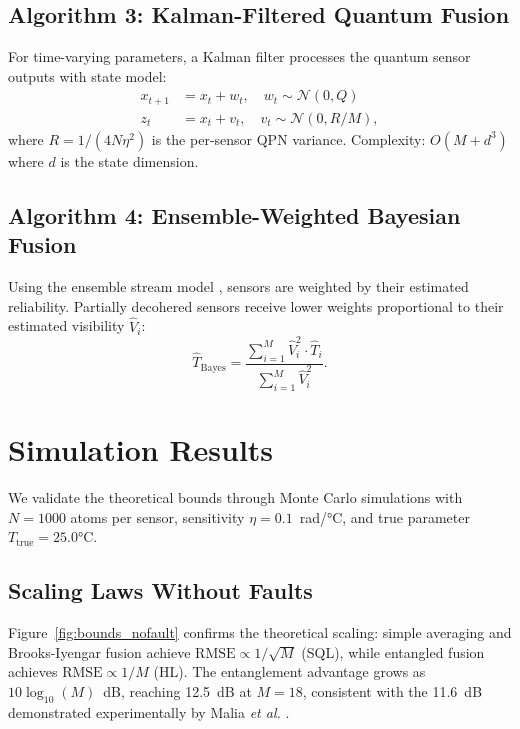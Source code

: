 \documentclass[twocolumn,11pt]{article}
\begin{document}
\subsection{Algorithm 3: Kalman-Filtered Quantum Fusion}

For time-varying parameters, a Kalman filter processes the
quantum sensor outputs with state model:
\begin{align}
    x_{t+1} &= x_t + w_t, \quad w_t \sim \mathcal{N}(0, Q) \\
    z_t &= x_t + v_t, \quad v_t \sim \mathcal{N}(0, R/M),
\end{align}
where $R = 1/(4N\eta^2)$ is the per-sensor QPN variance.
Complexity: $O(M + d^3)$ where $d$ is the state dimension.

\subsection{Algorithm 4: Ensemble-Weighted Bayesian Fusion}

Using the ensemble stream model \cite{iyer2013dissertation},
sensors are weighted by their estimated reliability.
Partially decohered sensors receive lower weights proportional
to their estimated visibility $\hat{V}_i$:
\begin{equation}
    \hat{T}_{\mathrm{Bayes}} =
    \frac{\sum_{i=1}^{M} \hat{V}_i^2 \cdot \hat{T}_i}
         {\sum_{i=1}^{M} \hat{V}_i^2}.
    \label{eq:bayesian}
\end{equation}


\section{Simulation Results}
\label{sec:simulations}

We validate the theoretical bounds through Monte Carlo
simulations with $N = 1000$ atoms per sensor,
sensitivity $\eta = 0.1$~rad/°C, and true parameter
$T_{\mathrm{true}} = 25.0$°C.

\subsection{Scaling Laws Without Faults}

Figure~\ref{fig:bounds_nofault} confirms the theoretical
scaling: simple averaging and Brooks-Iyengar fusion achieve
$\mathrm{RMSE} \propto 1/\sqrt{M}$ (SQL), while entangled
fusion achieves $\mathrm{RMSE} \propto 1/M$ (HL).
The entanglement advantage grows as $10\log_{10}(M)$~dB,
reaching 12.5~dB at $M = 18$, consistent with the 11.6~dB
demonstrated experimentally by Malia \textit{et al.}
\cite{malia2022distributed}.
\end{document}

